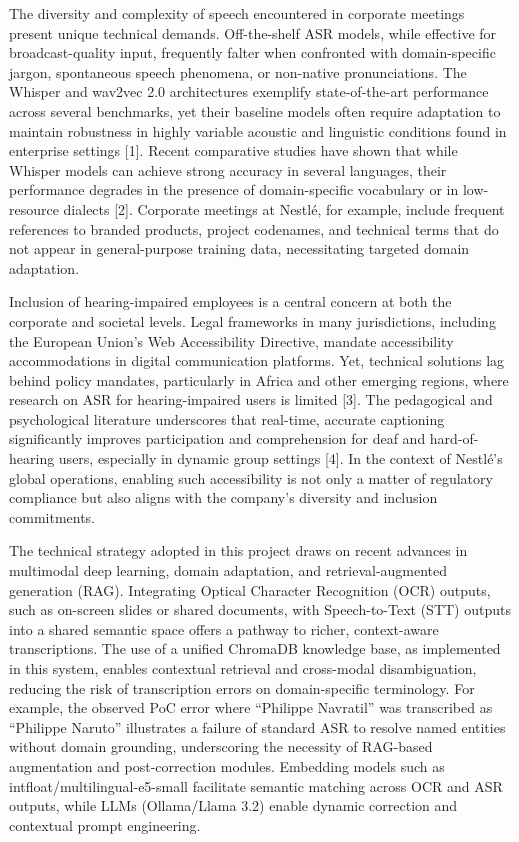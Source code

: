 \documentclass[12pt,a4paper]{article}
\begin{document}
The diversity and complexity of speech encountered in corporate meetings present unique technical demands. Off-the-shelf ASR models, while effective for broadcast-quality input, frequently falter when confronted with domain-specific jargon, spontaneous speech phenomena, or non-native pronunciations. The Whisper and wav2vec 2.0 architectures exemplify state-of-the-art performance across several benchmarks, yet their baseline models often require adaptation to maintain robustness in highly variable acoustic and linguistic conditions found in enterprise settings [1]. Recent comparative studies have shown that while Whisper models can achieve strong accuracy in several languages, their performance degrades in the presence of domain-specific vocabulary or in low-resource dialects [2]. Corporate meetings at Nestlé, for example, include frequent references to branded products, project codenames, and technical terms that do not appear in general-purpose training data, necessitating targeted domain adaptation.


Inclusion of hearing-impaired employees is a central concern at both the corporate and societal levels. Legal frameworks in many jurisdictions, including the European Union’s Web Accessibility Directive, mandate accessibility accommodations in digital communication platforms. Yet, technical solutions lag behind policy mandates, particularly in Africa and other emerging regions, where research on ASR for hearing-impaired users is limited [3]. The pedagogical and psychological literature underscores that real-time, accurate captioning significantly improves participation and comprehension for deaf and hard-of-hearing users, especially in dynamic group settings [4]. In the context of Nestlé’s global operations, enabling such accessibility is not only a matter of regulatory compliance but also aligns with the company’s diversity and inclusion commitments.


The technical strategy adopted in this project draws on recent advances in multimodal deep learning, domain adaptation, and retrieval-augmented generation (RAG). Integrating Optical Character Recognition (OCR) outputs, such as on-screen slides or shared documents, with Speech-to-Text (STT) outputs into a shared semantic space offers a pathway to richer, context-aware transcriptions. The use of a unified ChromaDB knowledge base, as implemented in this system, enables contextual retrieval and cross-modal disambiguation, reducing the risk of transcription errors on domain-specific terminology. For example, the observed PoC error where “Philippe Navratil” was transcribed as “Philippe Naruto” illustrates a failure of standard ASR to resolve named entities without domain grounding, underscoring the necessity of RAG-based augmentation and post-correction modules. Embedding models such as intfloat/multilingual-e5-small facilitate semantic matching across OCR and ASR outputs, while LLMs (Ollama/Llama 3.2) enable dynamic correction and contextual prompt engineering.
\end{document}
